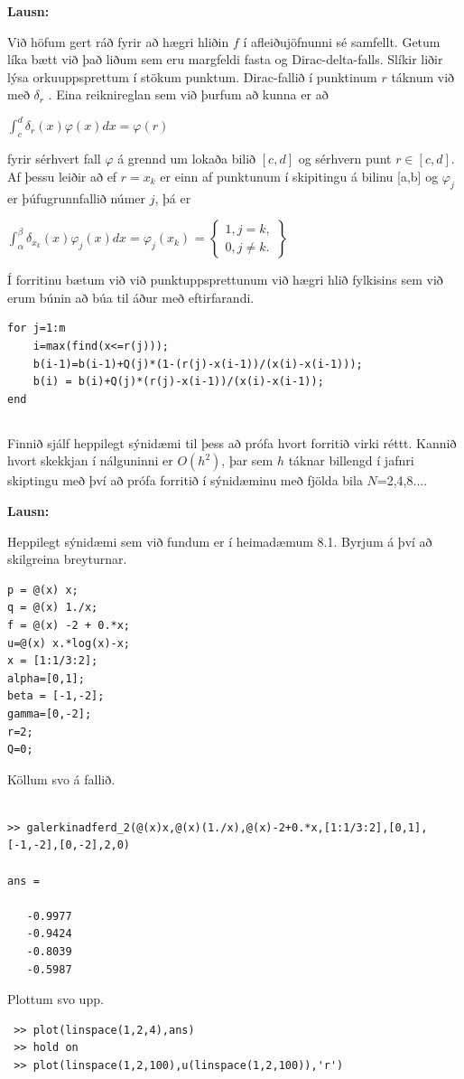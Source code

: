 \documentclass[11pt,a4paper,titlepage]{article}
\begin{document}
\par
\textbf{Lausn:} \par
Við höfum gert ráð fyrir að hægri hliðin $f$ í afleiðujöfnunni sé samfellt. Getum líka bætt við það liðum sem eru margfeldi fasta og Dirac-delta-falls. Slíkir liðir lýsa orkuuppsprettum í stökum punktum.  Dirac-fallið í punktinum $r$ táknum við með $\delta _{r}$ . Eina reiknireglan sem við þurfum að kunna er að 

$\int_{c}^{d}\delta _{r}(x) \varphi (x)dx=\varphi(r)$

fyrir sérhvert fall $\varphi$ á grennd um lokaða bilið $[c,d]$ og sérhvern punt $r\in[c,d]$. Af þessu leiðir að ef $r=x_{k}$ er einn af punktunum í skipitingu á bilinu [a,b] og $\varphi_{j}$ er þúfugrunnfallið númer $j$, þá er 

$\int_{\alpha}^{\beta}\delta_{x_{k}}(x)\varphi_{j}(x)dx = \varphi_{j}(x_{k})$
=
$\begin{Bmatrix}
1, j=k,
\\ 
0, j \neq k .
\end{Bmatrix}$

Í forritinu bætum við við punktuppsprettunum við hægri hlið fylkisins sem við erum búnin að búa til áður með eftirfarandi. 
\begin{verbatim}
for j=1:m
    i=max(find(x<=r(j)));
    b(i-1)=b(i-1)+Q(j)*(1-(r(j)-x(i-1))/(x(i)-x(i-1)));
    b(i) = b(i)+Q(j)*(r(j)-x(i-1))/(x(i)-x(i-1));
end
\end{verbatim}
 


\subsection{}
Finnið sjálf heppilegt sýnidæmi til þess að prófa hvort forritið virki réttt. Kannið hvort skekkjan í nálguninni er $O(h^2)$, þar sem $h$ táknar billengd í jafnri skiptingu með því að prófa forritið í sýnidæminu með fjölda bila $N$=2,4,8....

\par
\textbf{Lausn:}\par 
Heppilegt sýnidæmi sem við fundum er í heimadæmum 8.1. Byrjum á því að skilgreina breyturnar. 
\begin{verbatim}
p = @(x) x;
q = @(x) 1./x;
f = @(x) -2 + 0.*x;
u=@(x) x.*log(x)-x;
x = [1:1/3:2];
alpha=[0,1];
beta = [-1,-2];
gamma=[0,-2];
r=2;
Q=0;
\end{verbatim}
Köllum svo á fallið. 
\begin{verbatim}

>> galerkinadferd_2(@(x)x,@(x)(1./x),@(x)-2+0.*x,[1:1/3:2],[0,1],[-1,-2],[0,-2],2,0)

ans =

   -0.9977
   -0.9424
   -0.8039
   -0.5987
\end{verbatim}
 Plottum svo upp. 
 \begin{verbatim}
 >> plot(linspace(1,2,4),ans)
 >> hold on
 >> plot(linspace(1,2,100),u(linspace(1,2,100)),'r')
 \end{verbatim}
 
\end{document}
